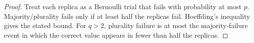 \begin{proof}
Treat each replica as a Bernoulli trial that fails with probability at most $p$.  Majority/plurality fails only if at least half the replicas fail.  Hoeffding's inequality gives the stated bound.  For $q>2$, plurality failure is at most the majority-failure event in which the correct value appears in fewer than half the replicas.
\end{proof}
